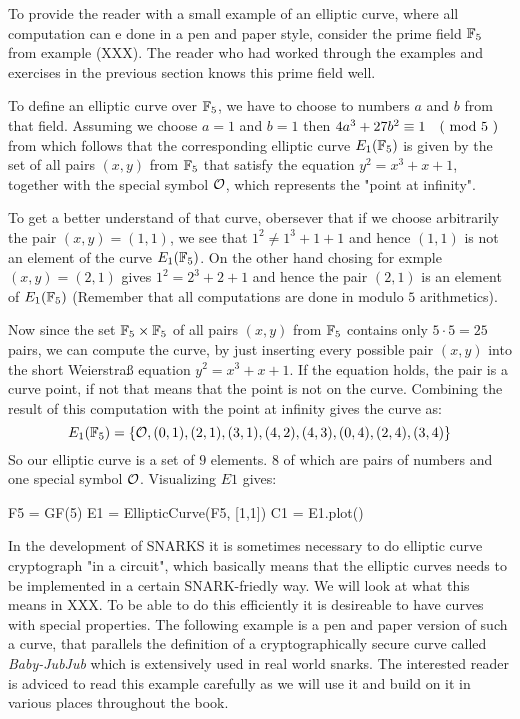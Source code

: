 \begin{example}To provide the reader with a small example of an elliptic curve, where all computation can e done in a pen and paper style, consider the prime field $\mathbb{F}_5$ from example (XXX). The reader who had worked through the examples and exercises in the previous section knows this prime field well.

To define an elliptic curve over $\mathbb{F}_5$, we have to choose to numbers $a$ and $b$ from that field. Assuming we choose $a=1$ and $b=1$ then $4a^3+ 27b^2 \equiv 1 \quad \text{( mod } 5 \text{ )}$ from which follows that the corresponding elliptic curve $E_1(\mathbb{F}_5)$ is given by the set of all pairs $(x,y)$ from $\mathbb{F}_5$ that satisfy the equation $y^2=x^3+x+1$, together with the special symbol $\mathcal{O}$, which represents the "point at infinity".

To get a better understand of that curve, obersever that if we choose arbitrarily the pair $(x,y)=(1,1)$, we see that $1^2 \neq 1^3+1 + 1$ and hence $(1,1)$ is not an element of the curve $E_1(\mathbb{F}_5)$. On the other hand chosing for exmple $(x,y)=(2,1)$ gives $1^2 = 2^3 + 2 + 1$ and hence the pair $(2,1)$ is an element of $E_1(\mathbb{F}_5)$ (Remember that all computations are done in modulo $5$ arithmetics).

Now since the set $\mathbb{F}_5\times \mathbb{F}_5$ of all pairs $(x,y)$ from $\mathbb{F}_5$ contains only $5\cdot 5=25$ pairs, we can compute the curve, by just inserting every possible pair $(x,y)$ into the short Weierstraß equation $y^2 = x^3 + x +1$. If the equation holds, the pair is a curve point, if not that means that the point is not on the curve. Combining the result of this computation with the point at infinity gives the curve as:
$$
E_1(\mathbb{F}_5) = \{\mathcal{O}, (0,1),(2,1),(3,1),(4,2),(4,3),(0,4),(2,4),(3,4)\}
$$
So our elliptic curve is a set of $9$ elements. $8$ of which are pairs of numbers and one special symbol $\mathcal{O}$. Visualizing $E1$ gives:
\begin{sagesilent}
F5 = GF(5)
E1 = EllipticCurve(F5, [1,1])
C1 = E1.plot()
\end{sagesilent}
\begin{center}
\end{center}
\end{example}
In the development of SNARKS it is sometimes necessary to do elliptic curve cryptograph "in a circuit", which basically means that the elliptic curves needs to be implemented in a certain SNARK-friedly way. We will look at what this means in XXX. To be able to do this efficiently it is desireable to have curves with special properties. The following example is a pen and paper version of such a curve, that parallels the definition of a cryptographically secure curve called \textit{Baby-JubJub} which is extensively used in real world snarks. The interested reader is adviced to read this example carefully as we will use it and build on it in various places throughout the book.

